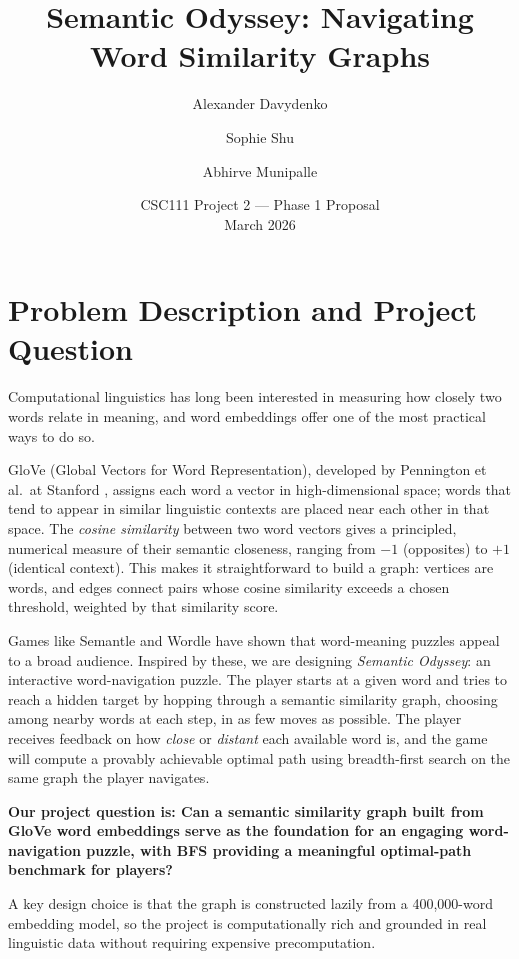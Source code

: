 \documentclass[11pt]{article}
\title{\textbf{Semantic Odyssey: Navigating Word Similarity Graphs}}
\author{
    Alexander Davydenko \and
    Sophie Shu \and
    Abhirve Munipalle
}
\date{CSC111 Project 2 --- Phase 1 Proposal \\ March 2026}
\begin{document}
\maketitle

\section{Problem Description and Project Question}

Computational linguistics has long been interested in measuring how closely two
words relate in meaning, and word embeddings offer one of the most practical
ways to do so.

GloVe (Global Vectors for Word Representation), developed by Pennington et al.\
at Stanford \cite{glove}, assigns each word a vector in high-dimensional space;
words that tend to appear in similar linguistic contexts are placed near each
other in that space. The \emph{cosine similarity} between two word vectors gives
a principled, numerical measure of their semantic closeness, ranging from $-1$
(opposites) to $+1$ (identical context). This makes it straightforward to build
a graph: vertices are words, and edges connect pairs whose cosine similarity
exceeds a chosen threshold, weighted by that similarity score.

Games like Semantle and Wordle have shown that word-meaning puzzles appeal to a
broad audience. Inspired by these, we are designing \emph{Semantic Odyssey}: an
interactive word-navigation puzzle. The player starts at a given word and tries
to reach a hidden target by hopping through a semantic similarity graph,
choosing among nearby words at each step, in as few moves as possible. The
player receives feedback on how \emph{close} or \emph{distant} each available
word is, and the game will compute a provably achievable optimal path using
breadth-first search on the same graph the player navigates.

\textbf{Our project question is: Can a semantic similarity graph built from
GloVe word embeddings serve as the foundation for an engaging word-navigation
puzzle, with BFS providing a meaningful optimal-path benchmark for players?}

A key design choice is that the graph is constructed lazily from a
400,000-word embedding model, so the project is computationally rich and
grounded in real linguistic data without requiring expensive precomputation.


\end{document}
